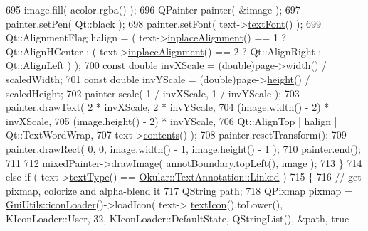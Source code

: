 \begin{DoxyCode}
695                     image.fill( acolor.rgba() );
696                     QPainter painter( &image );
697                     painter.setPen( Qt::black );
698                     painter.setFont( text->\hyperlink{classOkular_1_1TextAnnotation_aa48f194058046e70141412a5e85e7199}{textFont}() );
699                     Qt::AlignmentFlag halign = ( text->\hyperlink{classOkular_1_1TextAnnotation_ada96fce5c424867d6b48a8ae39a8cace}{inplaceAlignment}() == 1 ? 
      Qt::AlignHCenter : ( text->\hyperlink{classOkular_1_1TextAnnotation_ada96fce5c424867d6b48a8ae39a8cace}{inplaceAlignment}() == 2 ? Qt::AlignRight : Qt::AlignLeft ) );
700                     \textcolor{keyword}{const} \textcolor{keywordtype}{double} invXScale = (double)page->\hyperlink{classOkular_1_1Page_a57114e88281da2a51b1bb0d5d4996d53}{width}() / scaledWidth;
701                     \textcolor{keyword}{const} \textcolor{keywordtype}{double} invYScale = (double)page->\hyperlink{classOkular_1_1Page_a67246a32b3e625946eb5c685b8372a4f}{height}() / scaledHeight;
702                     painter.scale( 1 / invXScale, 1 / invYScale );
703                     painter.drawText( 2 * invXScale, 2 * invYScale,
704                                       (image.width() - 2) * invXScale,
705                                       (image.height() - 2) * invYScale,
706                                       Qt::AlignTop | halign | Qt::TextWordWrap,
707                                       text->\hyperlink{classOkular_1_1Annotation_a3b0c9fcbe9d01e06bfcc7216d0035908}{contents}() );
708                     painter.resetTransform();
709                     painter.drawRect( 0, 0, image.width() - 1, image.height() - 1 );
710                     painter.end();
711 
712                     mixedPainter->drawImage( annotBoundary.topLeft(), image );
713                 \}
714                 \textcolor{keywordflow}{else} \textcolor{keywordflow}{if} ( text->\hyperlink{classOkular_1_1TextAnnotation_acf75a9a22542d3008a486298972e6dcf}{textType}() == 
      \hyperlink{classOkular_1_1TextAnnotation_af560204454bf812797bc95bea730b06eaf7d7133e8e4850bf030e108537a9887b}{Okular::TextAnnotation::Linked} )
715                 \{
716                 \textcolor{comment}{// get pixmap, colorize and alpha-blend it}
717                     QString path;
718                     QPixmap pixmap = \hyperlink{namespaceGuiUtils_aa855f96a43d2d14c51acb8282d775d0a}{GuiUtils::iconLoader}()->loadIcon( text->
      \hyperlink{classOkular_1_1TextAnnotation_a40844236e2ea8684a6b439c2c3784821}{textIcon}().toLower(), KIconLoader::User, 32, KIconLoader::DefaultState, QStringList(), &path, true 

\end{DoxyCode}
